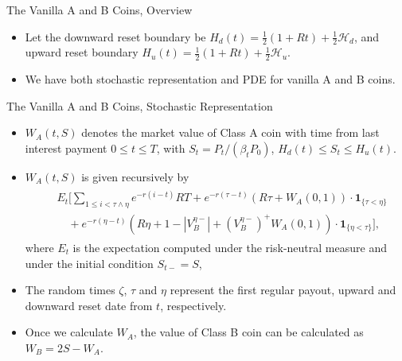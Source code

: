 \documentclass[notes=show, beamer, handout]{beamer}
\begin{document}
\begin{frame}{The Vanilla A and B Coins, Overview}

\begin{itemize}



\item
Let the downward reset boundary be $H_{d}(t)=\frac{1}{2}(1+Rt)+\frac{1}{2}\mathcal{H}_{d}$, and upward reset boundary $H_{u}(t)=\frac{1}{2}(1+Rt)+\frac{1}{2}\mathcal{H}_{u}$.

\item We have both stochastic representation and PDE for vanilla A and B coins.
\end{itemize}

\end{frame}


\begin{frame}{The Vanilla A and B Coins, Stochastic Representation}
\small
\begin{itemize}
\item $W_{A}(t,S)$ denotes the market value of Class A coin with time from last interest payment $0\le t\le T$, with $S_t=P_t/(\beta_t P_0)$, $H_{d}(t)\le S_t \le H_{u}(t)$.
\item $W_{A}(t,S)$ is given recursively by
\begin{align*}
\begin{split} ~ & E_{t}\Bigg[\sum_{1\le i<\tau\land\eta}e^{-r(i-t)}RT+e^{-r(\tau-t)}(R\tau+W_{A}(0,1))\cdot\mathbf{1}_{\{\tau<\eta\}}\\
 & \quad+e^{-r(\eta-t)}(R\eta+1-|V_{B}^{\eta-}|+(V_{B}^{\eta-})^+W_{A}(0,1))\cdot\mathbf{1}_{\{\eta<\tau\}}\Bigg],
\end{split}
\end{align*}
where $E_{t}$ is the expectation computed under the risk-neutral measure and under the initial condition $S_{t-}=S$,
\item The random times $\zeta$, $\tau$ and $\eta$ represent the first regular payout, upward and downward reset date from $t$, respectively. 


\item Once we calculate $W_A$, the value of Class B coin can be calculated as $W_B=2S- W_A$.
\end{itemize}


\end{frame}
\end{document}

